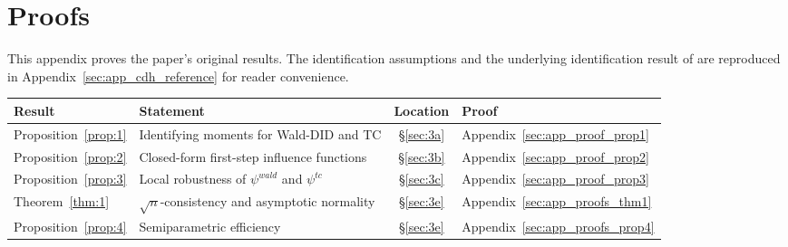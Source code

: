 \section{Proofs}

This appendix proves the paper's original results. The identification assumptions and the underlying identification result of \citet{fuzzy2018} are reproduced in Appendix~\ref{sec:app_cdh_reference} for reader convenience.

\begin{center}
\small
\begin{tabular}{llcl}
\toprule
Result & Statement & Location & Proof \\
\midrule
Proposition~\ref{prop:1} & Identifying moments for Wald-DID and TC & §\ref{sec:3a} & Appendix~\ref{sec:app_proof_prop1} \\
Proposition~\ref{prop:2} & Closed-form first-step influence functions & §\ref{sec:3b} & Appendix~\ref{sec:app_proof_prop2} \\
Proposition~\ref{prop:3} & Local robustness of $\psi^{wald}$ and $\psi^{tc}$ & §\ref{sec:3c} & Appendix~\ref{sec:app_proof_prop3} \\
Theorem~\ref{thm:1} & $\sqrt{n}$-consistency and asymptotic normality & §\ref{sec:3e} & Appendix~\ref{sec:app_proofs_thm1} \\
Proposition~\ref{prop:4} & Semiparametric efficiency & §\ref{sec:3e} & Appendix~\ref{sec:app_proofs_prop4} \\
\bottomrule
\end{tabular}
\end{center}


